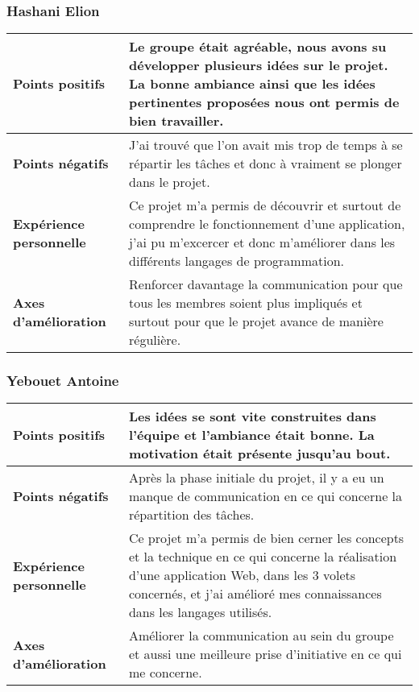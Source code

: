 \subsubsection{Hashani Elion}
\noindent
\begin{tabularx}{\textwidth}{|X|X|}
    \hline
    \textbf{Points positifs} & Le groupe était agréable, nous avons su développer plusieurs idées sur le projet. La bonne ambiance ainsi que les idées pertinentes proposées nous ont permis de bien travailler.  \\
    \hline
    \textbf{Points négatifs} & J'ai trouvé que l'on avait mis trop de temps à se répartir les tâches et donc à vraiment se plonger dans le projet.\\
    \hline
    \textbf{Expérience personnelle} & Ce projet m'a permis de découvrir et surtout de comprendre le fonctionnement d'une application, j'ai pu m'excercer et donc m'améliorer dans les différents langages de programmation.\\
    \hline
    \textbf{Axes d'amélioration} & Renforcer davantage la communication pour que tous les membres soient plus impliqués et surtout pour que le projet avance de manière régulière. \\
    \hline
\end{tabularx}
\subsubsection{Yebouet Antoine}
\noindent
\begin{tabularx}{\textwidth}{|X|X|}
    \hline
    \textbf{Points positifs} & Les idées se sont vite construites dans l'équipe et l'ambiance était bonne. La motivation était présente jusqu'au bout.\\
    \hline
    \textbf{Points négatifs} &  Après la phase initiale du projet, il y a eu un manque de communication en ce qui concerne la répartition des tâches.\\
    \hline
    \textbf{Expérience personnelle} & Ce projet m'a permis de bien cerner les concepts et la technique en ce qui concerne la réalisation d'une application Web, dans les 3 volets concernés, et j'ai amélioré mes connaissances dans les langages utilisés.\\
    \hline
    \textbf{Axes d'amélioration} & Améliorer la communication au sein du groupe et aussi une meilleure prise d'initiative en ce qui me concerne.\\
    \hline
\end{tabularx}
\vskip 0.60cm